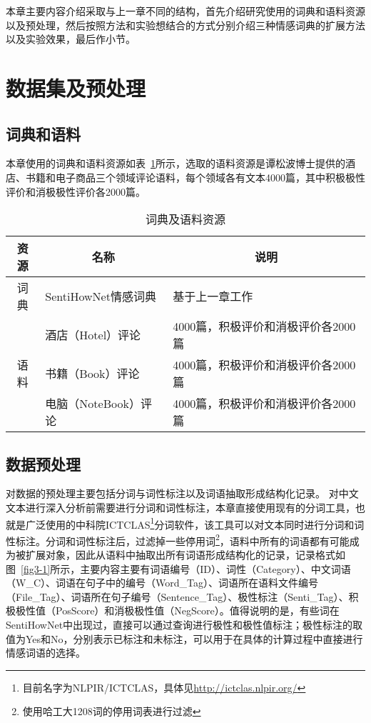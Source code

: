 本章主要内容介绍采取与上一章不同的结构，首先介绍研究使用的词典和语料资源以及预处理，然后按照方法和实验想结合的方式分别介绍三种情感词典的扩展方法以及实验效果，最后作小节。
\section{数据集及预处理}

\subsection{词典和语料}
本章使用的词典和语料资源如表~\ref{tab3-1}所示，选取的语料资源是谭松波博士提供的酒店、书籍和电子商品三个领域评论语料，每个领域各有文本4000篇，其中积极极性评价和消极极性评价各2000篇。
\begin{table}[htp]
\centering
\caption{词典及语料资源}
\label{tab3-1}
\begin{tabular}{|c|l|l|}
\hline
资源 & \multicolumn{1}{c|}{名称} & \multicolumn{1}{c|}{说明} \\ \hline
词典 & SentiHowNet情感词典 & 基于上一章工作 \\ \hline
\multirow{3}{*}{语料} & 酒店（Hotel）评论 & 4000篇，积极评价和消极评价各2000篇 \\ \cline{2-3} 
 & 书籍（Book）评论 & 4000篇，积极评价和消极评价各2000篇 \\ \cline{2-3} 
 & 电脑（NoteBook）评论 & 4000篇，积极评价和消极评价各2000篇 \\ \hline
\end{tabular}
\end{table}

\subsection{数据预处理}
对数据的预处理主要包括分词与词性标注以及词语抽取形成结构化记录。
对中文文本进行深入分析前需要进行分词和词性标注，本章直接使用现有的分词工具，也就是广泛使用的中科院ICTCLAS\footnote{目前名字为NLPIR/ICTCLAS，具体见\url{http://ictclas.nlpir.org/}}分词软件，该工具可以对文本同时进行分词和词性标注。分词和词性标注后，过滤掉一些停用词\footnote{使用哈工大1208词的停用词表进行过滤}，语料中所有的词语都有可能成为被扩展对象，因此从语料中抽取出所有词语形成结构化的记录，记录格式如图~\ref{fig3-1}所示，主要内容主要有词语编号（ID）、词性（Category）、中文词语（W\_C）、词语在句子中的编号（Word\_Tag）、词语所在语料文件编号（File\_Tag）、词语所在句子编号（Sentence\_Tag）、极性标注（Senti\_Tag）、积极极性值（PosScore）和消极极性值（NegScore）。值得说明的是，有些词在SentiHowNet中出现过，直接可以通过查询进行极性和极性值标注；极性标注的取值为Yes和No，分别表示已标注和未标注，可以用于在具体的计算过程中直接进行情感词语的选择。

